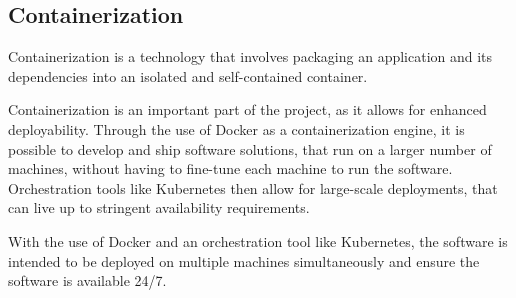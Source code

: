


\subsection{Containerization} %

Containerization is a technology that involves packaging an application and its dependencies into an isolated and self-contained container.

Containerization is an important part of the project, as it allows for enhanced deployability. Through the use of Docker as a containerization engine, it is possible to develop and ship software solutions, that run on a larger number of machines, without having to fine-tune each machine to run the software. Orchestration tools like Kubernetes then allow for large-scale deployments, that can live up to stringent availability requirements. 

With the use of Docker and an orchestration tool like Kubernetes, the software is intended to be deployed on multiple machines simultaneously and ensure the software is available 24/7.



